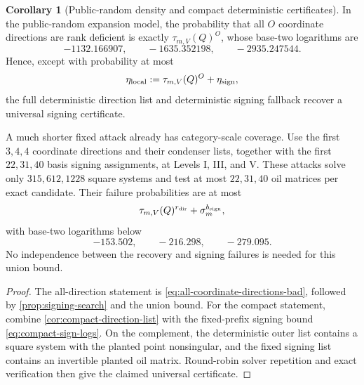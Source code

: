 \documentclass[11pt,a4paper]{article}
\theoremstyle{definition}
\newtheorem{corollary}[theorem]{Corollary}
\theoremstyle{remark}
\begin{document}
\begin{corollary}[Public-random density and compact deterministic certificates]\label{cor:graph-ideal-recovery}
In the public-random expansion model, the probability that all $O$ coordinate directions are rank deficient is exactly $\tau_{m,V}(Q)^O$, whose base-two logarithms are
\[
 -1132.166907,\qquad-1635.352198,\qquad-2935.247544.
\]
Hence, except with probability at most
\begin{equation}\label{eq:eta-local-functional}
 \eta_{\rm local}:=\tau_{m,V}(Q)^O+\eta_{\rm sign},
\end{equation}
the full deterministic direction list and deterministic signing fallback recover a universal signing certificate.

A much shorter fixed attack already has category-scale coverage.  Use the first $3,4,4$ coordinate directions and their condenser lists, together with the first $22,31,40$ basis signing assignments, at Levels I, III, and V.  These attacks solve only $315,612,1228$ square systems and test at most $22,31,40$ oil matrices per exact candidate.  Their failure probabilities are at most
\[
 \tau_{m,V}(Q)^{r_{\rm dir}}+\sigma_m^{b_{\rm sign}},
\]
with base-two logarithms below
\begin{equation}\label{eq:compact-combined-logs}
 -153.502,\qquad-216.298,\qquad-279.095.
\end{equation}
No independence between the recovery and signing failures is needed for this union bound.
\end{corollary}

\begin{proof}
The all-direction statement is \eqref{eq:all-coordinate-directions-bad}, followed by \cref{prop:signing-search} and the union bound.  For the compact statement, combine \cref{cor:compact-direction-list} with the fixed-prefix signing bound \eqref{eq:compact-sign-logs}.  On the complement, the deterministic outer list contains a square system with the planted point nonsingular, and the fixed signing list contains an invertible planted oil matrix.  Round-robin solver repetition and exact verification then give the claimed universal certificate.
\end{proof}
\end{document}
